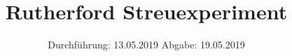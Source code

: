 

\subject{V16}
\title{Rutherford Streuexperiment}
\date{%
  Durchführung: 13.05.2019
  \hspace{3em}
  Abgabe: 19.05.2019
}



\maketitle
\thispagestyle{empty}
\tableofcontents
\newpage






\printbibliography{}


